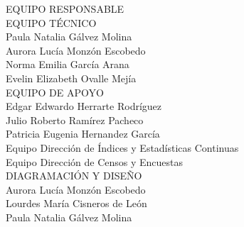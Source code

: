 {\Bold \LARGE EQUIPO RESPONSABLE}\\[2cm]
{\Bold \large \color{color1!89!black} EQUIPO TÉCNICO}\\[0.2cm]
Paula Natalia Gálvez Molina\\
Aurora Lucía Monzón Escobedo\\
Norma Emilia García Arana\\
Evelin Elizabeth Ovalle Mejía\\[0.8cm]
{\Bold \large \color{color1!89!black} EQUIPO DE APOYO}\\[0.2cm]
Edgar Edwardo Herrarte Rodríguez\\
Julio Roberto Ramírez Pacheco \\
Patricia Eugenia Hernandez García\\
Equipo Dirección de Índices y Estadísticas Continuas\\
Equipo Dirección de Censos y Encuestas\\[0.8cm]
{\Bold \large \color{color1!89!black} DIAGRAMACIÓN Y DISEÑO}\\[0.2cm]
Aurora Lucía Monzón Escobedo\\
Lourdes María Cisneros de León\\
Paula Natalia Gálvez Molina\\[0.8cm]
